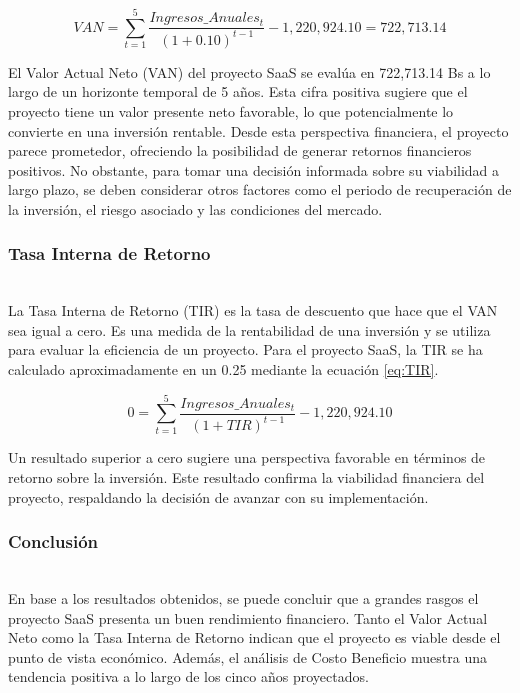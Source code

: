 \begin{equation}
    \label{eq:VAN}
    VAN = \sum_{t=1}^{5} \frac{Ingresos\_Anuales_t}{(1+0.10)^{t-1}} - 1,220,924.10 = 722,713.14
\end{equation}
    
El Valor Actual Neto (VAN) del proyecto SaaS se evalúa en 722,713.14 Bs a lo largo de un horizonte temporal de 5 años. Esta cifra positiva sugiere que el proyecto tiene un valor presente neto favorable, lo que potencialmente lo convierte en una inversión rentable. Desde esta perspectiva financiera, el proyecto parece prometedor, ofreciendo la posibilidad de generar retornos financieros positivos. No obstante, para tomar una decisión informada sobre su viabilidad a largo plazo, se deben considerar otros factores como el periodo de recuperación de la inversión, el riesgo asociado y las condiciones del mercado.

\subsubsection{Tasa Interna de Retorno}\hfill\\ 
\indent
La Tasa Interna de Retorno (TIR) es la tasa de descuento que hace que el VAN sea igual a cero. Es una medida de la rentabilidad de una inversión y se utiliza para evaluar la eficiencia de un proyecto. Para el proyecto SaaS, la TIR se ha calculado aproximadamente en un 0.25 mediante la ecuación \ref{eq:TIR}.

\begin{equation} \label{eq:TIR}
    0 = \sum_{t=1}^{5} \frac{Ingresos\_Anuales_t}{(1+TIR)^{t-1}}- 1,220,924.10
\end{equation}

Un resultado superior a cero sugiere una perspectiva favorable en términos de retorno sobre la inversión. Este resultado confirma la viabilidad financiera del proyecto, respaldando la decisión de avanzar con su implementación.

\subsubsection{Conclusión}\hfill\\ 
\indent
En base a los resultados obtenidos, se puede concluir que a grandes rasgos el proyecto SaaS presenta un buen rendimiento financiero. Tanto el Valor Actual Neto como la Tasa Interna de Retorno indican que el proyecto es viable desde el punto de vista económico. Además, el análisis de Costo Beneficio muestra una tendencia positiva a lo largo de los cinco años proyectados.

